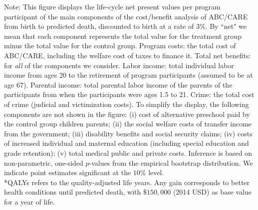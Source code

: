 \documentclass[static]{JJH-Beamer}
\begin{document}
\vspace{-16mm}
{\flushleft \small Note: This figure displays the life-cycle net present values per program participant of the main components of the cost/benefit analysis of ABC/CARE from birth to predicted death, discounted to birth at a rate of 3\%. By ``net" we mean that each component represents the total value for the treatment group minus the total value for the control group. Program costs: the total cost of ABC/CARE, including the welfare cost of taxes to finance it. Total net benefits: for \textit{all} of the components we consider. Labor income: total individual labor income from ages 20 to the retirement of program participants (assumed to be at age 67). Parental income: total parental labor income of the parents of the participants from when the participants were ages 1.5 to 21. Crime: the total cost of crime (judicial and victimization costs). To simplify the display, the following components are not shown in the figure: (i) cost of alternative preschool paid by the control group children parents; (ii) the social welfare costs of transfer income from the government; (iii) disability benefits and social security claims; (iv) costs of increased individual and maternal education (including special education and grade retention); (v) total medical public and private costs. Inference is based on non-parametric, one-sided $p$-values from the empirical bootstrap distribution. We indicate point estimates significant at the $10\%$ level.\\
*QALYs refers to the quality-adjusted life years. Any gain corresponds to better health conditions until predicted death, with $\$150,000$ (2014 USD) as base value for a year of life.\\}

\clearpage
\end{document}
